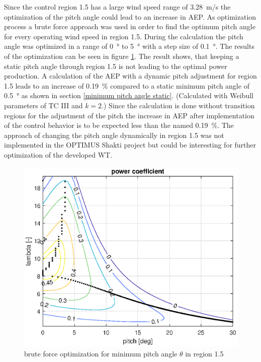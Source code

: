 Since the control region 1.5 has a large wind speed range of \SI{3.28}{m/s} the optimization of the pitch angle could lead to an increase in AEP.
As optimization process a brute force approach was used in order to find the optimum pitch angle for every operating wind speed in region 1.5. 
During the calculation the pitch angle was optimized in a range of \SI{0}{\degree} to \SI{5}{\degree} with a step size of \SI{0.1}{\degree}. 
The results of the optimization can be seen in figure \ref{fig:theta min dynamic}. 
The result shows, that keeping a static pitch angle through region 1.5 is not leading to the optimal power production. 
A calculation of the AEP with a dynamic pitch adjustment for region 1.5 leads to an increase of \SI{0.19}{\%} compared to a static minimum pitch angle of \SI{0.5}{\degree} as shown in section \ref{minimum pitch angle static}.
(Calculated with Weibull parameters of TC III and $k=2$.)
Since the calculation is done without transition regions for the adjustment of the pitch the increase in AEP after implementation of the control behavior is to be expected less than the named \SI{0.19}{\%}.
The approach of changing the pitch angle dynamically in region 1.5 was not implemented in the OPTIMUS Shakti project but could be interesting for further optimization of the developed WT.  

\begin{figure}[h]
	\centering	
	\includegraphics[width=12cm]{Figures/ThetaMinOptDynamic}
	\caption{brute force optimization for minimum pitch angle $\theta$ in region 1.5}
	\label{fig:theta min dynamic}
\end{figure}
